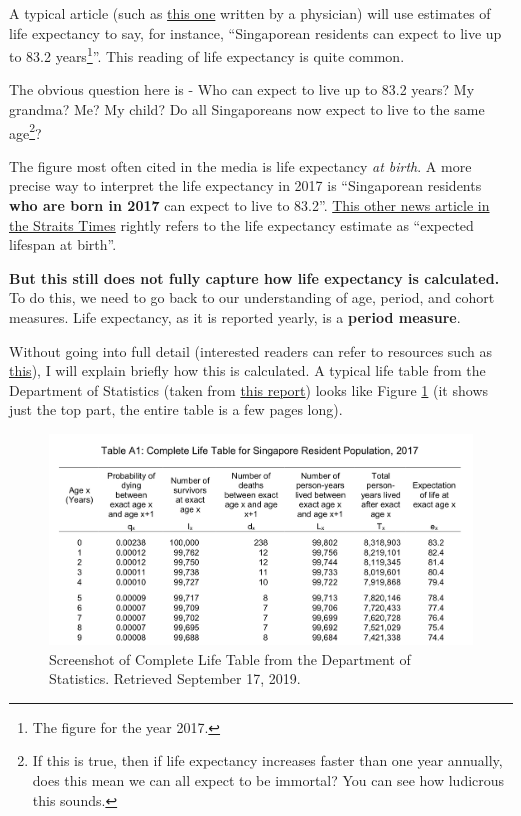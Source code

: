 \documentclass[
  openany]{book}
\begin{document}
A typical article (such as \href{https://www.healthxchange.sg/seniors/healthy-ageing/why-singaporeans-living-longer}{this one} written by a physician) will use estimates of life expectancy to say, for instance, ``Singaporean residents can expect to live up to 83.2 years\footnote{The figure for the year 2017.}''. This reading of life expectancy is quite common.

The obvious question here is - Who can expect to live up to 83.2 years? My grandma? Me? My child? Do all Singaporeans now expect to live to the same age\footnote{If this is true, then if life expectancy increases faster than one year annually, does this mean we can all expect to be immortal? You can see how ludicrous this sounds.}?

The figure most often cited in the media is life expectancy \emph{at birth}. A more precise way to interpret the life expectancy in 2017 is ``Singaporean residents \textbf{who are born in 2017} can expect to live to 83.2''. \href{https://www.straitstimes.com/singapore/health/singapore-tops-in-life-expectancy-at-848-years}{This other news article in the Straits Times} rightly refers to the life expectancy estimate as ``expected lifespan at birth''.

\textbf{But this still does not fully capture how life expectancy is calculated.} To do this, we need to go back to our understanding of age, period, and cohort measures. Life expectancy, as it is reported yearly, is a \textbf{period measure}.

Without going into full detail (interested readers can refer to resources such as \href{https://www.measureevaluation.org/resources/training/online-courses-and-resources/non-certificate-courses-and-mini-tutorials/multiple-decrement-life-tables/lesson-3}{this}), I will explain briefly how this is calculated. A typical life table from the Department of Statistics (taken from \href{https://www.singstat.gov.sg/-/media/files/publications/population/lifetable17-18.pdf}{this report}) looks like Figure \ref{fig:apc-lifetable} (it shows just the top part, the entire table is a few pages long).

\begin{figure}

{\centering \includegraphics[width=0.8\linewidth]{images/apc/apc_lifetable} 

}

\caption{Screenshot of Complete Life Table from the Department of Statistics. Retrieved September 17, 2019.}\label{fig:apc-lifetable}
\end{figure}
\end{document}
